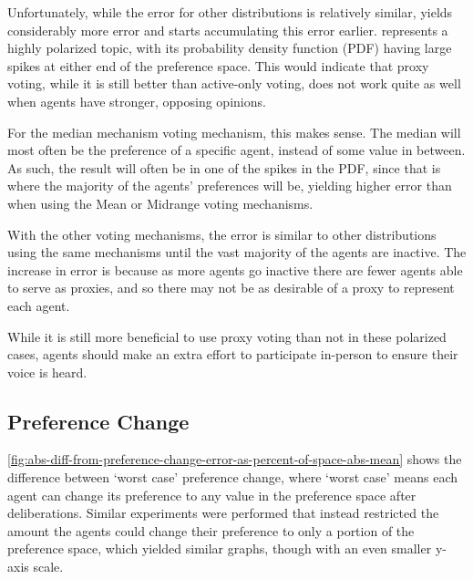 Unfortunately, while the error for other distributions is relatively similar,
 yields considerably more error and starts accumulating
this error earlier.
 represents a highly polarized topic, with its probability
density function (PDF) having large spikes at either end of the preference space.
This would indicate that proxy voting, while it is still better than active-only
voting, does not work quite as well when agents have stronger, opposing opinions.

For the median mechanism voting mechanism, this makes sense.
The median will most often be the preference of a specific agent, instead of some
value in between.
As such, the result will often be in one of the spikes in the PDF, since that is
where the majority of the agents' preferences will be, yielding higher error than when
using the Mean or Midrange voting mechanisms.

With the other voting mechanisms, the error is similar to other distributions using
the same mechanisms until the vast majority of the agents are inactive.
The increase in error is because as more agents go inactive there are fewer agents able
to serve as proxies, and so there may not be as desirable of a proxy to represent
each agent.

While it is still more beneficial to use proxy voting than not in these polarized
cases, agents should make an extra effort to participate in-person to ensure their
voice is heard.

\subsection{Preference Change}\label{subsec:results-shift}
\autoref{fig:abs-diff-from-preference-change-error-as-percent-of-space-abs-mean} shows
the difference between `worst case' preference change, where `worst case' means each
agent can change its preference to any value in the preference space after
deliberations.  
Similar experiments were performed that instead restricted the amount the agents
could change their preference to only a portion of the preference space, which
yielded similar graphs, though with an even smaller y-axis scale.

